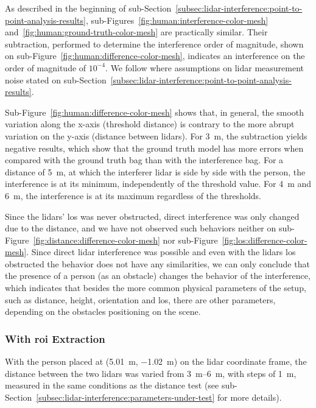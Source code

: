 As described in the beginning of sub-Section~\ref{subsec:lidar-interference:point-to-point-analysis-results}, sub-Figures~\ref{fig:human:interference-color-mesh} and~\ref{fig:human:ground-truth-color-mesh} are practically similar. Their subtraction, performed to determine the interference order of magnitude, shown on sub-Figure~\ref{fig:human:difference-color-mesh}, indicates an interference on the order of magnitude of $10^{-4}$. We follow where assumptions on \ac{lidar} measurement noise stated on sub-Section~\ref{subsec:lidar-interference:point-to-point-analysis-results}.

Sub-Figure~\ref{fig:human:difference-color-mesh} shows that, in general, the smooth variation along the x-axis (threshold distance) is contrary to the more abrupt variation on the y-axis (distance between \acp{lidar}). For \SI{3}{\meter}, the subtraction yields negative results, which show that the ground truth model has more errors when compared with the ground truth bag than with the interference bag. For a distance of \SI{5}{\meter}, at which the interferer \ac{lidar} is side by side with the person, the interference is at its minimum, independently of the threshold value. For \SI{4}{\meter} and \SI{6}{\meter}, the interference is at its maximum regardless of the thresholds. 

Since the \acp{lidar}' \ac{los} was never obstructed, direct interference was only changed due to the distance, and we have not observed such behaviors neither on sub-Figure~\ref{fig:distance:difference-color-mesh} nor sub-Figure~\ref{fig:los:difference-color-mesh}. Since direct  \ac{lidar} interference was possible and even with the \acp{lidar} \ac{los} obstructed the behavior does not have any similarities, we can only conclude that the presence of a person (as an obstacle) changes the behavior of the interference, which indicates that besides the more common physical parameters of the setup, such as distance, height, orientation and \ac{los}, there are other parameters, depending on the obstacles positioning on the scene.


\subsubsection{With \ac{roi} Extraction}
With the person placed at (\SI{5.01}{\meter}, \SI{-1.02}{\meter}) on the \ac{lidar} coordinate frame, the distance between the two \acp{lidar} was varied from \SIrange{3}{6}{\meter}, with steps of \SI{1}{\meter}, measured in the same conditions as the distance test (see sub-Section~\ref{subsec:lidar-interference:parameters-under-test} for more details).

